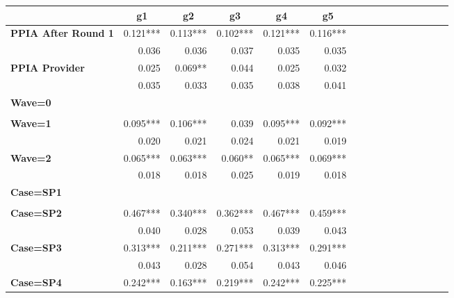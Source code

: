 \begin{tabular}{@{\extracolsep{5pt}}lrrrrrrrrrrrrrrr}
{\bf } & \multicolumn{1}{c}{\bf g1} & \multicolumn{1}{c}{\bf g2} & \multicolumn{1}{c}{\bf g3} & \multicolumn{1}{c}{\bf g4} & \multicolumn{1}{c}{\bf g5} \\
\hline
{\bf PPIA After Round 1} & 0.121*** & 0.113*** & 0.102*** & 0.121*** & 0.116*** \\
{\bf } & 0.036\phantom{***} & 0.036\phantom{***} & 0.037\phantom{***} & 0.035\phantom{***} & 0.035\phantom{***} \\
{\bf PPIA Provider} & 0.025\phantom{***} & 0.069**\phantom{*} & 0.044\phantom{***} & 0.025\phantom{***} & 0.032\phantom{***} \\
{\bf } & 0.035\phantom{***} & 0.033\phantom{***} & 0.035\phantom{***} & 0.038\phantom{***} & 0.041\phantom{***} \\
{\bf Wave=0} & \phantom{***} & \phantom{***} & \phantom{***} & \phantom{***} & \phantom{***} \\
{\bf } & \phantom{***} & \phantom{***} & \phantom{***} & \phantom{***} & \phantom{***} \\
{\bf Wave=1} & 0.095*** & 0.106*** & 0.039\phantom{***} & 0.095*** & 0.092*** \\
{\bf } & 0.020\phantom{***} & 0.021\phantom{***} & 0.024\phantom{***} & 0.021\phantom{***} & 0.019\phantom{***} \\
{\bf Wave=2} & 0.065*** & 0.063*** & 0.060**\phantom{*} & 0.065*** & 0.069*** \\
{\bf } & 0.018\phantom{***} & 0.018\phantom{***} & 0.025\phantom{***} & 0.019\phantom{***} & 0.018\phantom{***} \\
{\bf Case=SP1} & \phantom{***} & \phantom{***} & \phantom{***} & \phantom{***} & \phantom{***} \\
{\bf } & \phantom{***} & \phantom{***} & \phantom{***} & \phantom{***} & \phantom{***} \\
{\bf Case=SP2} & 0.467*** & 0.340*** & 0.362*** & 0.467*** & 0.459*** \\
{\bf } & 0.040\phantom{***} & 0.028\phantom{***} & 0.053\phantom{***} & 0.039\phantom{***} & 0.043\phantom{***} \\
{\bf Case=SP3} & 0.313*** & 0.211*** & 0.271*** & 0.313*** & 0.291*** \\
{\bf } & 0.043\phantom{***} & 0.028\phantom{***} & 0.054\phantom{***} & 0.043\phantom{***} & 0.046\phantom{***} \\
{\bf Case=SP4} & 0.242*** & 0.163*** & 0.219*** & 0.242*** & 0.225*** \\

\end{tabular}
